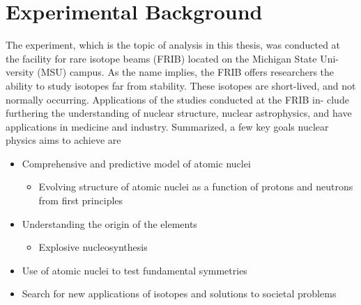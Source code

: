 
\section{Experimental Background}\label{sec:experimental-background}
The experiment, which is the topic of analysis in this thesis, was conducted at
the facility for rare isotope beams (FRIB) located on the Michigan State Uni-
versity (MSU) campus. As the name implies, the FRIB offers researchers the
ability to study isotopes far from stability. These isotopes are short-lived, and
not normally occurring. Applications of the studies conducted at the FRIB in-
clude furthering the understanding of nuclear structure, nuclear astrophysics,
and have applications in medicine and industry. Summarized, a few key goals nuclear 
physics aims to achieve are
\begin{itemize}
	\item Comprehensive and predictive model of atomic nuclei
	\begin{itemize}
		\item Evolving structure of atomic nuclei as a function of protons and neutrons from first principles
	\end{itemize}
	\item Understanding the origin of the elements
	\begin{itemize}
		\item Explosive nucleosynthesis
	\end{itemize}
	\item Use of atomic nuclei to test fundamental symmetries
	\item Search for new applications of isotopes and solutions to societal problems
\end{itemize}

